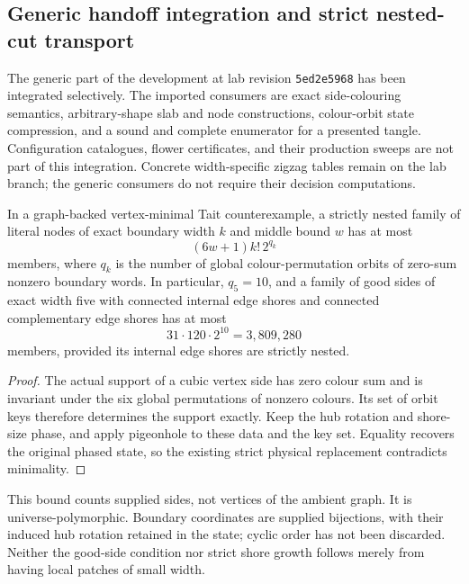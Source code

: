 \subsection{Generic handoff integration and strict nested-cut transport}
\label{sec:generic-handoff-integration}

The generic part of the development at lab revision
\texttt{5ed2e5968} has been integrated selectively.  The imported consumers
are exact side-colouring semantics, arbitrary-shape slab and node
constructions, colour-orbit state compression, and a sound and complete
enumerator for a presented tangle.  Configuration catalogues, flower
certificates, and their production sweeps are not part of this integration.
Concrete width-specific zigzag tables remain on the lab branch; the generic
consumers do not require their decision computations.

\begin{proposition}
\label{prop:compressed-supplied-nested-sides}
In a graph-backed vertex-minimal Tait counterexample, a strictly nested
family of literal nodes of exact boundary width $k$ and middle bound $w$
has at most
\[
                 (6w+1)k!\,2^{q_k}
\]
members, where $q_k$ is the number of global colour-permutation orbits of
zero-sum nonzero boundary words.  In particular, $q_5=10$, and a family of
good sides of exact width five with connected internal edge shores and
connected complementary edge shores has at most
\[
                         31\cdot120\cdot2^{10}=3{,}809{,}280
\]
members, provided its internal edge shores are strictly nested.
\end{proposition}

\begin{proof}
The actual support of a cubic vertex side has zero colour sum and is
invariant under the six global permutations of nonzero colours.  Its set
of orbit keys therefore determines the support exactly.  Keep the hub
rotation and shore-size phase, and apply pigeonhole to these data and the
key set.  Equality recovers the original phased state, so the existing
strict physical replacement contradicts minimality.
\end{proof}

This bound counts supplied sides, not vertices of the ambient graph.  It is
universe-polymorphic.  Boundary coordinates are supplied bijections, with
their induced hub rotation retained in the state; cyclic order has not been
discarded.  Neither the good-side condition nor strict shore growth follows
merely from having local patches of small width.

